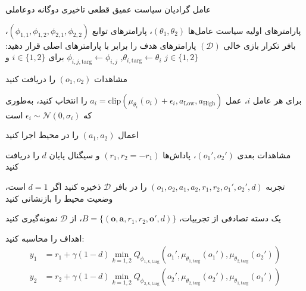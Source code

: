 \begin{algorithm}[H]
    \caption{عامل گرادیان سیاست عمیق قطعی تاخیری دوگانه دو­عاملی}\label{alg:MATD3}
    \begin{algorithmic}[1]
         پارامترهای اولیه سیاست عامل‌ها $(\theta_1, \theta_2)$، پارامترهای توابع  $(\phi_{1,1}, \phi_{1,2}, \phi_{2,1}, \phi_{2,2})$، بافر تکرار بازی خالی $(\mathcal{D})$
        \State پارامترهای هدف را برابر با پارامترهای اصلی قرار دهید: 
        \Statex \hspace{\algorithmicindent}
        $\theta_{i,\text{targ}} \leftarrow \theta_i$, $\phi_{i,j,\text{targ}} \leftarrow \phi_{i,j}$ برای $i \in \{1, 2\}$ و $j \in \{1, 2\}$
        
            \State \parbox[t]{\dimexpr\linewidth-\algorithmicindent}{
            مشاهدات $(o_1, o_2)$ را دریافت کنید
            \strut}
            \State \parbox[t]{\dimexpr\linewidth-\algorithmicindent}{
            برای هر عامل $i$، عمل $a_i = \text{clip}(\mu_{\theta_i}(o_i) + \epsilon_i, a_{\text{Low}}, a_{\text{High}})$ را انتخاب کنید، به‌طوری که $\epsilon_i \sim \mathcal{N}(0, \sigma_i)$ است
            \strut}
            \State اعمال $(a_1, a_2)$ را در محیط اجرا کنید
            \State \parbox[t]{\dimexpr\linewidth-\algorithmicindent}{
            مشاهدات بعدی $(o_1', o_2')$، پاداش‌ها $(r_1, r_2=-r_1)$ و سیگنال پایان $d$ را دریافت کنید
            \strut}
            \State تجربه $(o_1, o_2, a_1, a_2, r_1, r_2, o_1', o_2', d)$ را در بافر $\mathcal{D}$ ذخیره کنید
            \State اگر $d=1$ است، وضعیت محیط را بازنشانی کنید
            
                    \State \parbox[t]{\dimexpr\linewidth-\algorithmicindent}{
                    یک دسته تصادفی از تجربیات، $B = \{(\boldsymbol{o}, \boldsymbol{a}, r_1, r_2, \boldsymbol{o}', d)\}$، از $\mathcal{D}$ نمونه‌گیری کنید
                    \strut}
                    \State اهداف را محاسبه کنید:
                     \vspace{-15pt}
                    \begin{align*}
                        y_1 &= r_1 + \gamma (1-d) \min_{k=1,2} Q_{\phi_{1,k,\text{targ}}}(o_1', \mu_{\theta_{1,\text{targ}}}(o_1'), \mu_{\theta_{2,\text{targ}}}(o_2')) \\
                        y_2 &= r_2 + \gamma (1-d) \min_{k=1,2} Q_{\phi_{2,k,\text{targ}}}(o_2', \mu_{\theta_{2,\text{targ}}}(o_2'), \mu_{\theta_{1,\text{targ}}}(o_1'))
                    \end{align*}
                    \vspace{-35pt}
                    

\end{algorithmic}
\end{algorithm}
